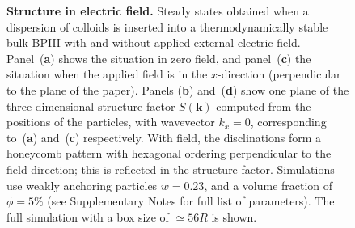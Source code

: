 \documentclass[12pt]{article}
\begin{document}
\begin{figure}
\begin{center}
\end{center}
\caption{\textbf{Structure in electric field.}
Steady states obtained when a dispersion of colloids is inserted
into a thermodynamically stable bulk BPIII with and without applied
external electric field. Panel~(\textbf{a}) shows the situation in
zero field, and panel~(\textbf{c})
the situation when the applied field is in the $x$-direction
(perpendicular to the plane of the paper). Panels (\textbf{b})
and~(\textbf{d}) show one
plane of the three-dimensional structure factor $S(\mathbf{k})$ computed
from the positions of the particles, with wavevector $k_x = 0$, corresponding
to~(\textbf{a}) and~(\textbf{c}) respectively. With field, the disclinations
form a honeycomb
pattern with hexagonal ordering perpendicular to the field direction;
this is reflected in the structure factor.
Simulations use weakly anchoring particles $w=0.23$, and a volume
fraction of $\phi=5\%$ (see Supplementary Notes for full list of
parameters).
The full simulation with a box size of $\simeq 56R$ is shown.}
\end{figure}
\end{document}
